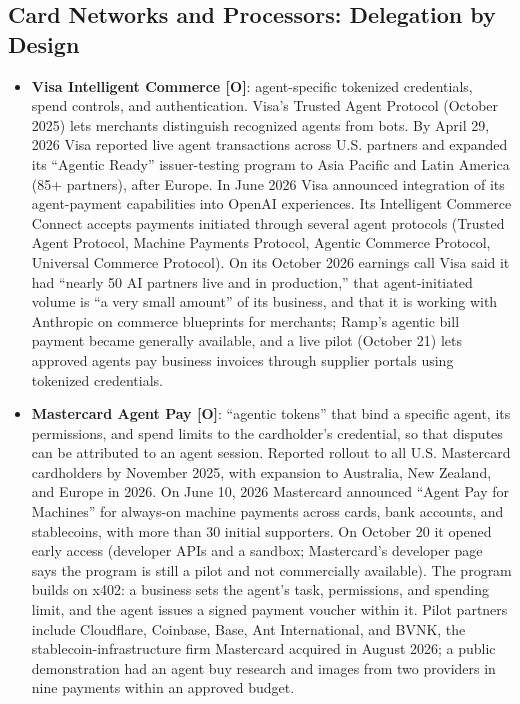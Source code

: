 \documentclass[11pt,letterpaper]{article}
\begin{document}
\subsection{Card Networks and Processors: Delegation by Design}

\begin{itemize}
  \item \textbf{Visa Intelligent Commerce [O]}: agent-specific tokenized credentials, spend controls, and authentication. Visa's Trusted Agent Protocol (October 2025) lets merchants distinguish recognized agents from bots. By April 29, 2026 Visa reported live agent transactions across U.S. partners and expanded its ``Agentic Ready'' issuer-testing program to Asia Pacific and Latin America (85+ partners), after Europe. In June 2026 Visa announced integration of its agent-payment capabilities into OpenAI experiences. Its Intelligent Commerce Connect accepts payments initiated through several agent protocols (Trusted Agent Protocol, Machine Payments Protocol, Agentic Commerce Protocol, Universal Commerce Protocol). On its October 2026 earnings call Visa said it had ``nearly 50 AI partners live and in production,'' that agent-initiated volume is ``a very small amount'' of its business, and that it is working with Anthropic on commerce blueprints for merchants; Ramp's agentic bill payment became generally available, and a live pilot (October 21) lets approved agents pay business invoices through supplier portals using tokenized credentials.
  \item \textbf{Mastercard Agent Pay [O]}: ``agentic tokens'' that bind a specific agent, its permissions, and spend limits to the cardholder's credential, so that disputes can be attributed to an agent session. Reported rollout to all U.S. Mastercard cardholders by November 2025, with expansion to Australia, New Zealand, and Europe in 2026. On June 10, 2026 Mastercard announced ``Agent Pay for Machines'' for always-on machine payments across cards, bank accounts, and stablecoins, with more than 30 initial supporters. On October 20 it opened early access (developer APIs and a sandbox; Mastercard's developer page says the program is still a pilot and not commercially available). The program builds on x402: a business sets the agent's task, permissions, and spending limit, and the agent issues a signed payment voucher within it. Pilot partners include Cloudflare, Coinbase, Base, Ant International, and BVNK, the stablecoin-infrastructure firm Mastercard acquired in August 2026; a public demonstration had an agent buy research and images from two providers in nine payments within an approved budget.

\end{itemize}
\end{document}
